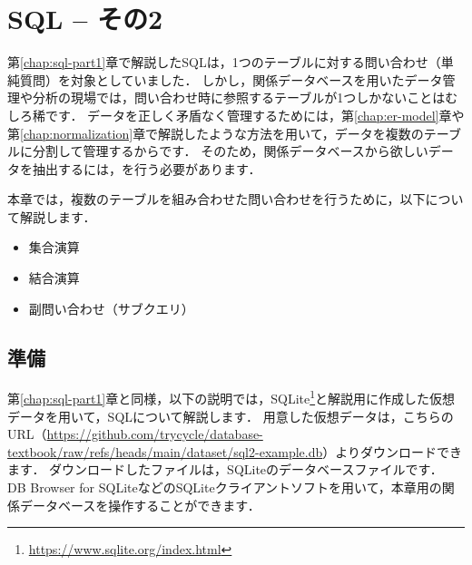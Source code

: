 \chapter{SQL -- その2}\label{chap:sql-part2}

第\ref{chap:sql-part1}章で解説したSQLは，1つのテーブルに対する問い合わせ（単純質問）を対象としていました．
しかし，関係データベースを用いたデータ管理や分析の現場では，問い合わせ時に参照するテーブルが1つしかないことはむしろ稀です．
データを正しく矛盾なく管理するためには，第\ref{chap:er-model}章や第\ref{chap:normalization}章で解説したような方法を用いて，データを複数のテーブルに分割して管理するからです．
そのため，関係データベースから欲しいデータを抽出するには，を行う必要があります．

本章では，複数のテーブルを組み合わせた問い合わせを行うために，以下について解説します．
\begin{itemize}
    \item 集合演算
    \item 結合演算
    \item 副問い合わせ（サブクエリ）
\end{itemize}


\section{準備}
第\ref{chap:sql-part1}章と同様，以下の説明では，SQLite\footnote{\url{https://www.sqlite.org/index.html}}と解説用に作成した仮想データを用いて，SQLについて解説します．
用意した仮想データは，こちらのURL（\url{https://github.com/trycycle/database-textbook/raw/refs/heads/main/dataset/sql2-example.db}）よりダウンロードできます．
ダウンロードしたファイルは，SQLiteのデータベースファイルです．
DB Browser for SQLiteなどのSQLiteクライアントソフトを用いて，本章用の関係データベースを操作することができます．

